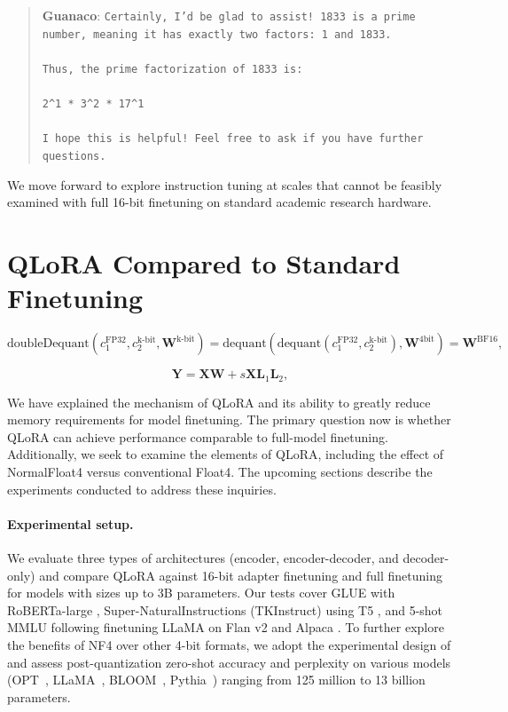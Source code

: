 \begin{quote}
    \textbf{Guanaco}: \texttt{Certainly, I’d be glad to assist! 1833 is a prime number, meaning it has exactly two factors: 1 and 1833. \\ \\ Thus, the prime factorization of 1833 is: \\ \\ 2\^{}1 * 3\^{}2 * 17\^{}1 \\ \\ I hope this is helpful! Feel free to ask if you have further questions.}
\end{quote}

We move forward to explore instruction tuning at scales that cannot be feasibly examined with full 16-bit finetuning on standard academic research hardware.

\section{QLoRA Compared to Standard Finetuning}
\label{sec:comp_to_std}

\begin{equation}
    \text{doubleDequant}(c_1^{\text{FP32}}, c_2^{\text{k-bit}}, \mathbf{W}^{\text{k-bit}}) = \text{dequant}(\text{dequant}(c_1^{\text{FP32}}, c_2^{\text{k-bit}}), \mathbf{W}^{\text{4bit}}) = \mathbf{W}^{\text{BF16}},
\end{equation}

\begin{equation}
    \mathbf{Y} = \mathbf{X}\mathbf{W} + s\mathbf{X}\mathbf{L}_1\mathbf{L}_2,
\end{equation}

We have explained the mechanism of QLoRA and its ability to greatly reduce memory requirements for model finetuning. The primary question now is whether QLoRA can achieve performance comparable to full-model finetuning. Additionally, we seek to examine the elements of QLoRA, including the effect of NormalFloat4 versus conventional Float4. The upcoming sections describe the experiments conducted to address these inquiries.

\paragraph{Experimental setup.} We evaluate three types of architectures (encoder, encoder-decoder, and decoder-only) and compare QLoRA against 16-bit adapter finetuning and full finetuning for models with sizes up to 3B parameters. Our tests cover GLUE \citep{wang2018glue} with RoBERTa-large \citep{liu2019roberta}, Super-NaturalInstructions (TKInstruct) \citep{wang2022super} using T5 \citep{t5}, and 5-shot MMLU \citep{hendrycksmeasuring} following finetuning LLaMA on Flan v2 \citep{longpre2023flan} and Alpaca \citep{alpaca}. To further explore the benefits of NF4 over other 4-bit formats, we adopt the experimental design of \citet{dettmers2022case} and assess post-quantization zero-shot accuracy and perplexity on various models (OPT~\citep{zhang2022opt}, LLaMA~\citep{touvron2023llama}, BLOOM~\citep{scao2022bloom}, Pythia~\citep{biderman2023pythia}) ranging from 125 million to 13 billion parameters.

